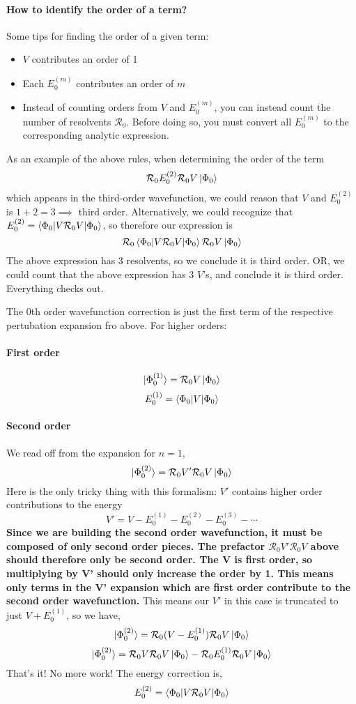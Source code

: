 \documentclass{article}
\newcommand{\Rz}{\mathcal{R}_{0}}
\newcommand{\Eone}{E^{(1)}}
\begin{document}
\paragraph{\textbf{How to identify the order of a term?}}
Some tips for finding the order of a given term:
\begin{itemize} 
\item $V$ contributes an order of 1
\item Each $E_0^{(m)}$ contributes an order of $m$
\item Instead of counting orders from $V$ and $E_0^{(m)}$, you can instead count
the number of resolvents $\Rz$. Before doing so, you must convert all $E_0^{(m)}$ to the 
corresponding analytic expression.
\end{itemize}
As an example of the above rules, when determining the order of the term 
\[ \Rz E_0^{(2)} \Rz V \ket{\Phi_0} \]
which appears in the third-order wavefunction, 
we could reason that $V$ and $E_0^{(2)}$ is $1 + 2 = 3 \implies$ third order.
Alternatively, we could recognize that $E_0^{(2)} = \braket{\Phi_0 |V \Rz V|\Phi_0}$,
so therefore our expression is 
\[ \Rz \braket{\Phi_0 |V \Rz V|\Phi_0} \Rz V \ket{\Phi_0} \]
The above expression has 3 resolvents, so we conclude it is third order.
OR, we could count that the above expression has 3 $V$'s, and conclude it is third order.
Everything checks out.

The 0th order wavefunction correction is just the first term of the respective pertubation expansion
fro above. For higher orders: 
\paragraph{\textbf{First order}}
\[ \ket{\Phi_0^{(1)}} = \Rz V \ket{\Phi_0}\]
\[ E_0^{(1)} = \braket{ \Phi_0 | V | \Phi_0} \]

\paragraph{\textbf{Second order}}
We read off from the expansion for $n=1$,
\[ \ket{\Phi_0^{(2)}} = \Rz V' \Rz V \ket{\Phi_0}\]
Here is the only tricky thing with this formalism: $V'$ contains 
higher order contributions to the energy 
\[V' = V - E_0^{(1)} - E_0^{(2)} - E_0^{(3)} - \cdots\]
\textbf{Since we are building the second order wavefunction, it must be composed of only 
second order pieces. The prefactor $\Rz V' \Rz V$ above should therefore only be second order. 
The V is first order, so multiplying by V' should only increase the order by 1. 
This means only terms in the V' expansion which are first order contribute 
to the second order wavefunction.}
This means our $V'$ in this case is truncated to just $V + E_0^{(1)}$,
so we have,
\[\ket{\Phi_0^{(2)}} = \Rz (V - \Eone_0) \Rz V \ket{\Phi_0}\]
\[\ket{\Phi_0^{(2)}} = \Rz V \Rz V \ket{\Phi_0} - \Rz \Eone_0 \Rz V \ket{\Phi_0}\]
That's it! No more work!
The energy correction is,
\[ E_0^{(2)} = \braket{ \Phi_0 | V \Rz V | \Phi_0} \]
\end{document}
